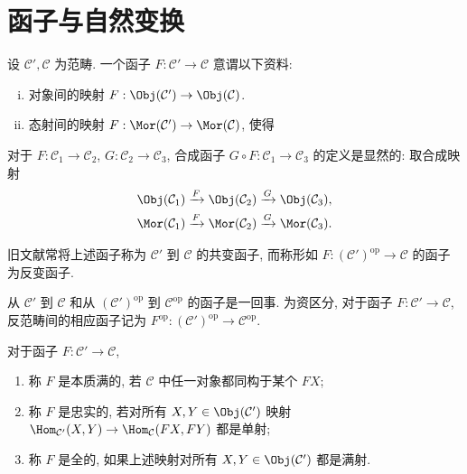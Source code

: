 \section{函子与自然变换}\label{sec:functors}
\begin{definition}[函子]\label{def:functor}
	设 $\mathcal{C}', \mathcal{C}$ 为范畴. 一个函子 $F: \mathcal{C}' \to \mathcal{C}$ 意谓以下资料:
	\begin{enumerate}[(i)]
		\item 对象间的映射 $F: \Obj(\mathcal{C}') \to \Obj(\mathcal{C})$.
		\item 态射间的映射 $F: \Mor(\mathcal{C}') \to \Mor(\mathcal{C})$, 使得
	\end{enumerate}
	对于 $F: \mathcal{C}_1 \to \mathcal{C}_2$, $G: \mathcal{C}_2 \to \mathcal{C}_3$, 合成函子 $G \circ F: \mathcal{C}_1 \to \mathcal{C}_3$ 的定义是显然的: 取合成映射
	\begin{gather*}
		\Obj(\mathcal{C}_1) \xrightarrow{F} \Obj(\mathcal{C}_2) \xrightarrow{G} \Obj(\mathcal{C}_3), \\
		\Mor(\mathcal{C}_1) \xrightarrow{F} \Mor(\mathcal{C}_2) \xrightarrow{G} \Mor(\mathcal{C}_3).
	\end{gather*}
\end{definition}
旧文献常将上述函子称为 $\mathcal{C}'$ 到 $\mathcal{C}$ 的共变函子, 而称形如 $F: (\mathcal{C}')^\text{op} \to \mathcal{C}$ 的函子为反变函子.

\begin{remark}\label{rem:op-functor}
	从 $\mathcal{C}'$ 到 $\mathcal{C}$ 和从 $(\mathcal{C}')^\text{op}$ 到 $\mathcal{C}^\text{op}$ 的函子是一回事. 为资区分, 对于函子 $F: \mathcal{C}' \to \mathcal{C}$, 反范畴间的相应函子记为 $F^\text{op}: (\mathcal{C}')^\text{op} \to \mathcal{C}^\text{op}$.
\end{remark}

\begin{definition}
	对于函子 $F:  \mathcal{C}' \to \mathcal{C}$,
	\begin{enumerate}
		\item 称 $F$ 是本质满的, 若 $\mathcal{C}$ 中任一对象都同构于某个 $FX$;
		\item 称 $F$ 是忠实的, 若对所有 $X, Y \in \Obj(\mathcal{C}')$ 映射 $\Hom_{\mathcal{C}'}(X, Y) \to \Hom_{\mathcal{C}}(FX, FY) $ 都是单射;
		\item 称 $F$ 是全的, 如果上述映射对所有 $X, Y \in \Obj(\mathcal{C}')$ 都是满射.
	\end{enumerate}
\end{definition}

